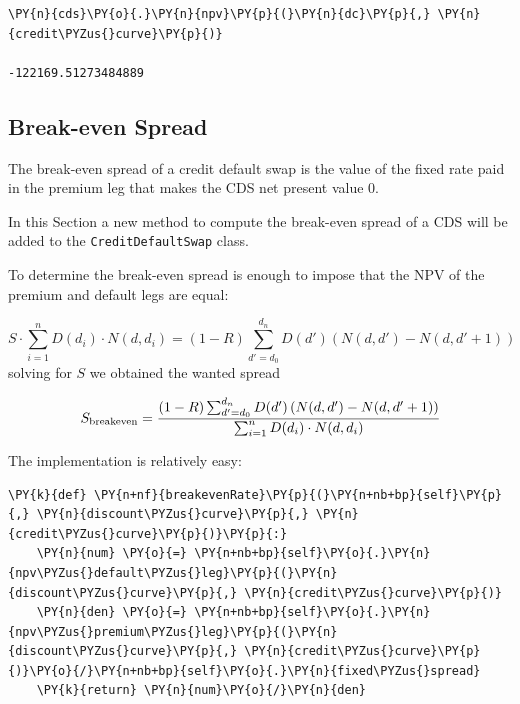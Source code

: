 \begin{codebox}
\begin{Verbatim}[commandchars=\\\{\}]
\PY{n}{cds}\PY{o}{.}\PY{n}{npv}\PY{p}{(}\PY{n}{dc}\PY{p}{,} \PY{n}{credit\PYZus{}curve}\PY{p}{)}

-122169.51273484889
\end{Verbatim}
\end{codebox}
	
\subsection{Break-even Spread}
The break-even spread of a credit default swap is the value of the fixed rate paid in the premium leg that makes the CDS net present value 0.

In this Section a new method to compute the break-even spread of a CDS will be added to the \texttt{CreditDefaultSwap} class.

To determine the break-even spread is enough to impose that the NPV of the premium and default legs are equal:

\begin{equation}
S \cdot\sum_{i=1}^{n} D(d_i) \cdot N(d, d_i)
= (1-R) \sum_{d'=d_0}^{d_n} D(d') \left( N(d, d') - N(d, d'+1) \right)
\end{equation}
solving for $S$ we obtained the wanted spread

\begin{equation}
S_{\mathrm{breakeven}} = \cfrac{(1-R) \sum_{d'=d_0}^{d_n} D(d') \left( N(d, d') - N(d, d'+1) \right)}{\sum_{i=1}^{n} D(d_i) \cdot N(d, d_i)}
\end{equation}

The implementation is relatively easy:

\begin{codebox}
\begin{Verbatim}[commandchars=\\\{\}]
  \PY{k}{def} \PY{n+nf}{breakevenRate}\PY{p}{(}\PY{n+nb+bp}{self}\PY{p}{,} \PY{n}{discount\PYZus{}curve}\PY{p}{,} \PY{n}{credit\PYZus{}curve}\PY{p}{)}\PY{p}{:}
    \PY{n}{num} \PY{o}{=} \PY{n+nb+bp}{self}\PY{o}{.}\PY{n}{npv\PYZus{}default\PYZus{}leg}\PY{p}{(}\PY{n}{discount\PYZus{}curve}\PY{p}{,} \PY{n}{credit\PYZus{}curve}\PY{p}{)}
    \PY{n}{den} \PY{o}{=} \PY{n+nb+bp}{self}\PY{o}{.}\PY{n}{npv\PYZus{}premium\PYZus{}leg}\PY{p}{(}\PY{n}{discount\PYZus{}curve}\PY{p}{,} \PY{n}{credit\PYZus{}curve}\PY{p}{)}\PY{o}{/}\PY{n+nb+bp}{self}\PY{o}{.}\PY{n}{fixed\PYZus{}spread}
    \PY{k}{return} \PY{n}{num}\PY{o}{/}\PY{n}{den}
\end{Verbatim}
\end{codebox}

